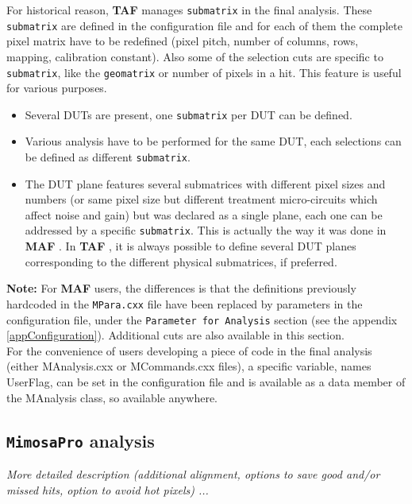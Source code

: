 \documentclass[a4paper, 12pt, twoside]{article}
\newif\ifwithcomment
\newcommand{\comment}[1]{\ifwithcomment {\textcolor{blue}{\it#1}} \fi}
\newcommand{\TAF}{{\bf TAF }}
\newcommand{\MAF}{{\bf MAF }}
\begin{document}
\noindent
For historical reason, \TAF manages {\tt submatrix} in the final analysis. These {\tt submatrix} are defined in the configuration file and for each of them the complete pixel matrix have to be redefined (pixel pitch, number of columns, rows, mapping, calibration constant). Also some of the selection cuts are specific to {\tt submatrix}, like the {\tt geomatrix} or number of pixels in a hit.
This feature is useful for various purposes.
\begin{itemize}
\setlength{\itemsep}{1mm}
\item Several DUTs are present, one {\tt submatrix} per DUT can be defined. 
\item Various analysis have to be performed for the same DUT, each selections can be defined as different {\tt submatrix}.
\item The DUT plane features several submatrices with different pixel sizes and numbers (or same pixel size but different treatment micro-circuits which affect noise and gain) but was declared as a single plane, each one can be addressed by a specific {\tt submatrix}. This is actually the way it was done in \MAF. In \TAF, it is always possible to define several DUT planes corresponding to the different physical submatrices, if preferred.
\end{itemize}

\noindent
{\bf Note:} For \MAF users, the differences is that the definitions previously hardcoded in the {\tt MPara.cxx} file have been replaced by parameters in the configuration file, under the {\tt Parameter for Analysis} section (see the appendix \ref{appConfiguration}). Additional cuts are also available in this section.\\ 

\noindent
For the convenience of users developing a piece of code in the final analysis (either MAnalysis.cxx or MCommands.cxx files), a specific variable, names UserFlag, can be set in the configuration file and is available as a data member of the MAnalysis class, so available anywhere.

\vspace{0.8 cm}

\comment{Short description of each MimosaXXXX method is needed.}

\subsection{{\tt MimosaPro} analysis}

{\it More detailed description (additional alignment, options to save good and/or missed hits, option to avoid hot pixels) ...}
\end{document}
